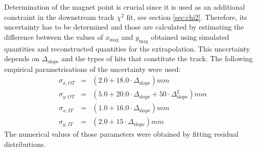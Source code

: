 Determination of the magnet point is crucial since it is used as an additional constraint in the downstream track $\chi^{2}$ fit, see section \ref{sec:chi2}. Therefore, its uncertainty has to be determined and those are calculated by estimating the difference between the values of $x_{\text{mag}}$ and
$y_{\text{mag}}$ obtained using simulated quantities and reconstructed quantities for the extrapolation. This uncertainty depends on $\Delta_{\text{slope}}$ and the types of hits that constitute the track. 
The following empirical parametrisations of the uncertainty
were used:
\begin{eqnarray}
\sigma_{x, OT} & = & (2.0 + 18.0\cdot \Delta_{\text{slope}})mm \nonumber \\
\sigma_{y, OT} & = & (5.0 + 20.0\cdot \Delta_{\text{slope}} + 50\cdot \Delta_{\text{slope}}^{2})mm  \nonumber \\
\sigma_{x, IT} & = & (1.0 + 16.0\cdot \Delta_{\text{slope}})mm  \nonumber \\
\sigma_{y, IT} & = & (2.0 + 15\cdot \Delta_{\text{slope}})mm  \nonumber
\end{eqnarray}
The numerical values of those parameters were obtained by fitting residual distributions.

